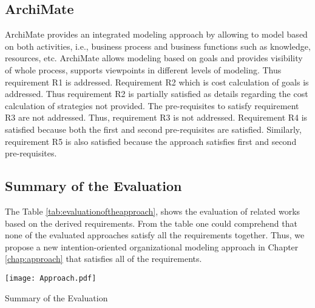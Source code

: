 \subsection{ArchiMate}
ArchiMate provides an integrated modeling approach by allowing to model based on both activities, i.e., business process and business functions such as knowledge, resources, etc. ArchiMate allows modeling based on goals and provides visibility of whole process, supports viewpoints in different levels of modeling. Thus requirement R1 is addressed. Requirement R2 which is cost calculation of goals is addressed. Thus requirement R2 is partially satisfied as details regarding the cost calculation of strategies not provided. The pre-requisites to satisfy requirement R3 are not addressed. Thus, requirement R3 is not addressed. Requirement R4 is satisfied because both the first and second pre-requisites are satisfied. Similarly, requirement R5 is also satisfied because the approach satisfies first and second pre-requisites.  

\subsection {Summary of the Evaluation}
 The Table \ref{tab:evaluationoftheapproach}, shows the evaluation of related works based on the derived requirements. From the table one could comprehend that none of the evaluated approaches satisfy all the requirements together. Thus, we propose a new intention-oriented organizational modeling approach in Chapter \ref{chap:approach} that satisfies all of the requirements. 

 \begin{table}
 	\centering
 	\texttt{[image: Approach.pdf]}
 	\caption{Summary of the Evaluation}
 	\label{tab:evaluationoftheapproach}
 \end{table} 


